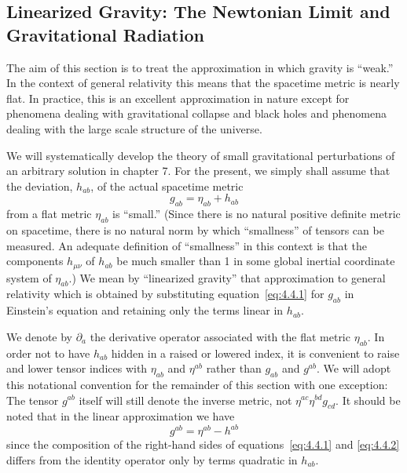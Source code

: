 
\subsection{Linearized Gravity: The Newtonian Limit and Gravitational
Radiation}\label{sec:4.4}

The aim of this section is to treat the approximation in which gravity is
``weak.'' In the context of general relativity this means that the spacetime metric
is nearly flat. In practice, this is an excellent approximation in nature except for
phenomena dealing with gravitational collapse and black holes and phenomena
dealing with the large scale structure of the universe.

We will systematically develop the theory of small gravitational perturbations of
an arbitrary solution in chapter 7. For the present, we simply shall assume that the
deviation, \(h_{ab}\), of the actual spacetime metric
\begin{equation}
  g_{ab}=\eta_{ab}+h_{ab}
  \tag{4.4.1}\label{eq:4.4.1}
\end{equation}
from a flat metric \(\eta_{ab}\) is ``small.'' (Since there is no natural positive
definite metric on spacetime, there is no natural norm by which ``smallness'' of
tensors can be measured. An adequate definition of ``smallness'' in this context is
that the components \(h_{\mu\nu}\) of \(h_{ab}\) be much smaller than 1 in some
global inertial coordinate system of \(\eta_{ab}\).) We mean by ``linearized
gravity'' that approximation to general relativity which is obtained by substituting
equation~\eqref{eq:4.4.1} for \(g_{ab}\) in Einstein's equation and retaining only
the terms linear in \(h_{ab}\).

We denote by \(\partial_a\) the derivative operator associated with the flat metric
\(\eta_{ab}\). In order not to have \(h_{ab}\) hidden in a raised or lowered index,
it is convenient to raise and lower tensor indices with \(\eta_{ab}\) and
\(\eta^{ab}\) rather than \(g_{ab}\) and \(g^{ab}\). We will adopt this notational
convention for the remainder of this section with one exception: The tensor
\(g^{ab}\) itself will still denote the inverse metric, not
\(\eta^{ac}\eta^{bd}g_{cd}\). It should be noted that in the linear approximation
we have
\begin{equation}
  g^{ab}=\eta^{ab}-h^{ab}
  \tag{4.4.2}\label{eq:4.4.2}
\end{equation}
since the composition of the right-hand sides of equations~\eqref{eq:4.4.1} and
\eqref{eq:4.4.2} differs from the identity operator only by terms quadratic in
\(h_{ab}\).

